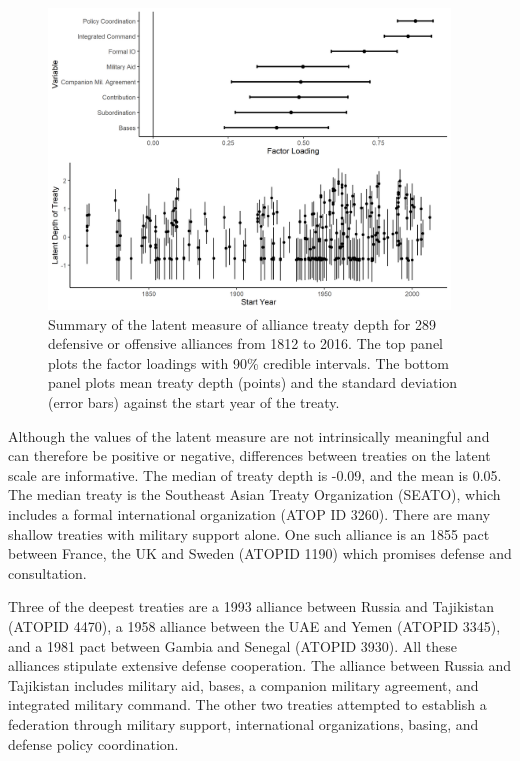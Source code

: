 \documentclass[12pt]{article}
\begin{document}
\begin{figure}
	\centering
		\includegraphics[width=0.95\textwidth]{../figures/ld-summary.png}
	\caption{Summary of the latent measure of alliance treaty depth for 289 defensive or offensive alliances from 1812 to 2016. The top panel plots the factor loadings with 90\% credible intervals. The bottom panel plots mean treaty depth (points) and the standard deviation (error bars) against the start year of the treaty.}
	\label{fig:ld-summary}
\end{figure}


Although the values of the latent measure are not intrinsically meaningful and can therefore be positive or negative, differences between treaties on the latent scale are informative. 
The median of treaty depth is -0.09, and the mean is 0.05. 
The median treaty is the Southeast Asian Treaty Organization (SEATO), which includes a formal international organization (ATOP ID 3260). 
There are many shallow treaties with military support alone. 
One such alliance is an 1855 pact between France, the UK and Sweden (ATOPID 1190) which promises defense and consultation. 


Three of the deepest treaties are a 1993 alliance between Russia and Tajikistan (ATOPID 4470), a 1958 alliance between the UAE and Yemen (ATOPID 3345), and a 1981 pact between Gambia and Senegal (ATOPID 3930). 
All these alliances stipulate extensive defense cooperation. 
The alliance between Russia and Tajikistan includes military aid, bases, a companion military agreement, and integrated military command. 
The other two treaties attempted to establish a federation through military support, international organizations, basing, and defense policy coordination.
\end{document}
